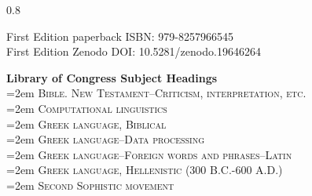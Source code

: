 \begin{flushleft}
\begin{spacing}{0.8}
\begin{footnotesize}
\noindent{}First Edition paperback ISBN: 979-8257966545 \\%
\noindent{}First Edition Zenodo DOI: 10.5281/zenodo.19646264 \\%

\vspace*{8mm} %

\noindent{}\textbf{Library of Congress Subject Headings} \\[1mm]%
\hangindent=2em \textsc{Bible. New Testament--Criticism, interpretation, etc.} \\
\hangindent=2em \textsc{Computational linguistics} \\
\hangindent=2em \textsc{Greek language, Biblical} \\
\hangindent=2em \textsc{Greek language--Data processing} \\
\hangindent=2em \textsc{Greek language--Foreign words and phrases--Latin} \\
\hangindent=2em \textsc{Greek language, Hellenistic (300 B.C.-600 A.D.)} \\
\hangindent=2em \textsc{Second Sophistic movement}
\end{footnotesize}
\end{spacing}
\end{flushleft}
\clearpage
%
%
\null%
\thispagestyle{empty}%
\clearpage%
%
%
\frontmatter %
%
\thispagestyle{empty}%
